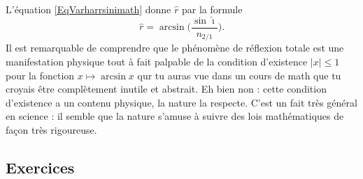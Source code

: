L'équation \eqref{EqVarharrsinimath} donne $\hat r$ par la formule  \label{PgExpCErefrtot}
\[ 
  \hat r=\arcsin\Big( \frac{ \sin\hat\imath }{ n_{2/1} } \Big).
\]
Il est remarquable de comprendre que le phénomène de réflexion totale est une manifestation physique tout à fait palpable de la condition d'existence $| x |\leq1$ pour la fonction $x\mapsto\arcsin x$ qur tu auras vue dans un cours de math que tu croyais être complètement inutile et abstrait. Eh bien non : cette condition d'existence a un contenu physique, la nature la respecte. C'est un fait très général en science : il semble que la nature s'amuse à suivre des lois mathématiques de façon très rigoureuse. 

\subsection{Exercices}



